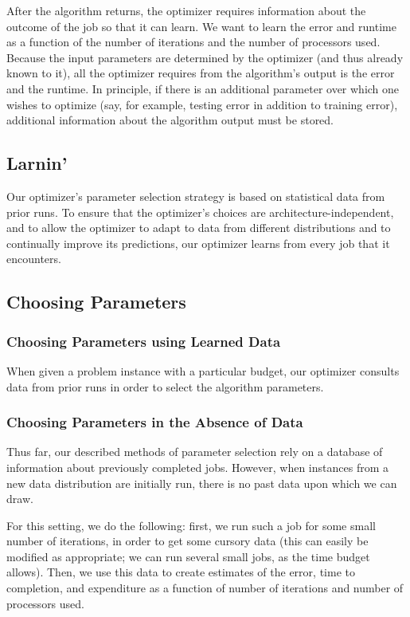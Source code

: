After the algorithm returns, the optimizer requires information about
the outcome of the job so that it can learn. We want to learn the error
and runtime as a function of the number of iterations and the number
of processors used. Because the input parameters are determined by the
optimizer (and thus already known to it), all the optimizer requires 
from the algorithm's output is the error and the runtime. In principle,
if there is an additional parameter over which one wishes to optimize
(say, for example, testing error in addition to training error),
additional information about the algorithm output must be stored. 

\subsection{Larnin'}

Our optimizer's parameter selection strategy is based on statistical 
data from prior runs. 
To ensure that the optimizer's choices are architecture-independent,
and to allow the optimizer to adapt to data from different distributions 
and to continually improve its predictions, our optimizer learns from
every job that it encounters. 




\subsection{Choosing Parameters}

\subsubsection{Choosing Parameters using Learned Data}
When given a problem instance with a particular budget, our optimizer
consults data from prior runs in order to select the algorithm 
parameters. 

\subsubsection{Choosing Parameters in the Absence of Data}
\label{sec:nodata}

Thus far, our described methods of parameter selection rely on a database
of information about previously completed jobs. However, when instances
from a new data distribution are initially run, there is no past data upon
which we can draw.

For this setting, we do the following: first, we run such a job for some
small number of iterations, in order to get some cursory data (this can
easily be modified as appropriate; we can run several small jobs, as the 
time budget allows). Then, we use this data to create estimates of the 
error, time to completion, and expenditure as a function of number of 
iterations and number of processors used.


